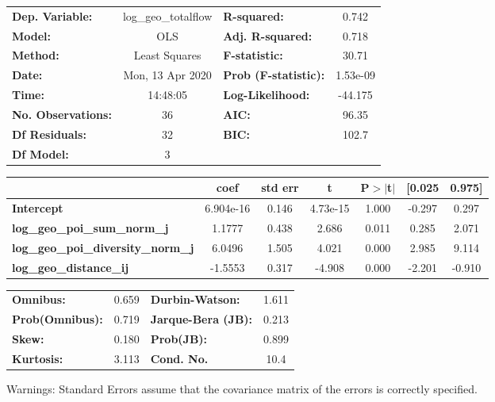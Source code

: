 \begin{center}
\begin{tabular}{lclc}
\toprule
\textbf{Dep. Variable:}                    & log\_geo\_totalflow & \textbf{  R-squared:         } &     0.742   \\
\textbf{Model:}                            &         OLS         & \textbf{  Adj. R-squared:    } &     0.718   \\
\textbf{Method:}                           &    Least Squares    & \textbf{  F-statistic:       } &     30.71   \\
\textbf{Date:}                             &   Mon, 13 Apr 2020  & \textbf{  Prob (F-statistic):} &  1.53e-09   \\
\textbf{Time:}                             &       14:48:05      & \textbf{  Log-Likelihood:    } &   -44.175   \\
\textbf{No. Observations:}                 &            36       & \textbf{  AIC:               } &     96.35   \\
\textbf{Df Residuals:}                     &            32       & \textbf{  BIC:               } &     102.7   \\
\textbf{Df Model:}                         &             3       & \textbf{                     } &             \\
\bottomrule
\end{tabular}
\begin{tabular}{lcccccc}
                                           & \textbf{coef} & \textbf{std err} & \textbf{t} & \textbf{P$> |$t$|$} & \textbf{[0.025} & \textbf{0.975]}  \\
\midrule
\textbf{Intercept}                         &    6.904e-16  &        0.146     &  4.73e-15  &         1.000        &       -0.297    &        0.297     \\
\textbf{log\_geo\_poi\_sum\_norm\_j}       &       1.1777  &        0.438     &     2.686  &         0.011        &        0.285    &        2.071     \\
\textbf{log\_geo\_poi\_diversity\_norm\_j} &       6.0496  &        1.505     &     4.021  &         0.000        &        2.985    &        9.114     \\
\textbf{log\_geo\_distance\_ij}            &      -1.5553  &        0.317     &    -4.908  &         0.000        &       -2.201    &       -0.910     \\
\bottomrule
\end{tabular}
\begin{tabular}{lclc}
\textbf{Omnibus:}       &  0.659 & \textbf{  Durbin-Watson:     } &    1.611  \\
\textbf{Prob(Omnibus):} &  0.719 & \textbf{  Jarque-Bera (JB):  } &    0.213  \\
\textbf{Skew:}          &  0.180 & \textbf{  Prob(JB):          } &    0.899  \\
\textbf{Kurtosis:}      &  3.113 & \textbf{  Cond. No.          } &     10.4  \\
\bottomrule
\end{tabular}
\end{center}

Warnings: \newline
 [1] Standard Errors assume that the covariance matrix of the errors is correctly specified.